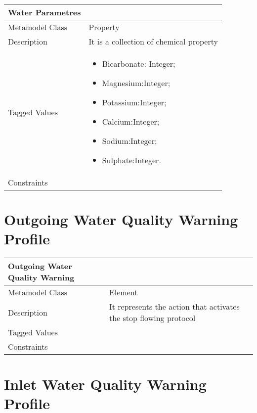 \begin{longtable}{|p{4cm}|p{9cm}|}

\hline
\textbf{Water Parametres} & \\


\hline
Metamodel Class & Property\\

\hline
Description & It is a collection of chemical property\\

\hline
Tagged Values & 
\begin{itemize}
\item Bicarbonate: Integer;
\item Magnesium:Integer;
\item Potassium:Integer;
\item Calcium:Integer;
\item Sodium:Integer;
\item Sulphate:Integer.
\end{itemize}\\

\hline
Constraints &\\

\hline
\end{longtable}

\section{Outgoing Water Quality Warning Profile}

\begin{longtable}{|p{4cm}|p{9cm}|}

\hline
\textbf{Outgoing Water Quality Warning} & \\


\hline
Metamodel Class & Element\\

\hline
Description & It represents the action that activates the stop flowing protocol\\

\hline
Tagged Values &\\

\hline
Constraints &\\

\hline
\end{longtable}

\section{Inlet Water Quality Warning Profile}

